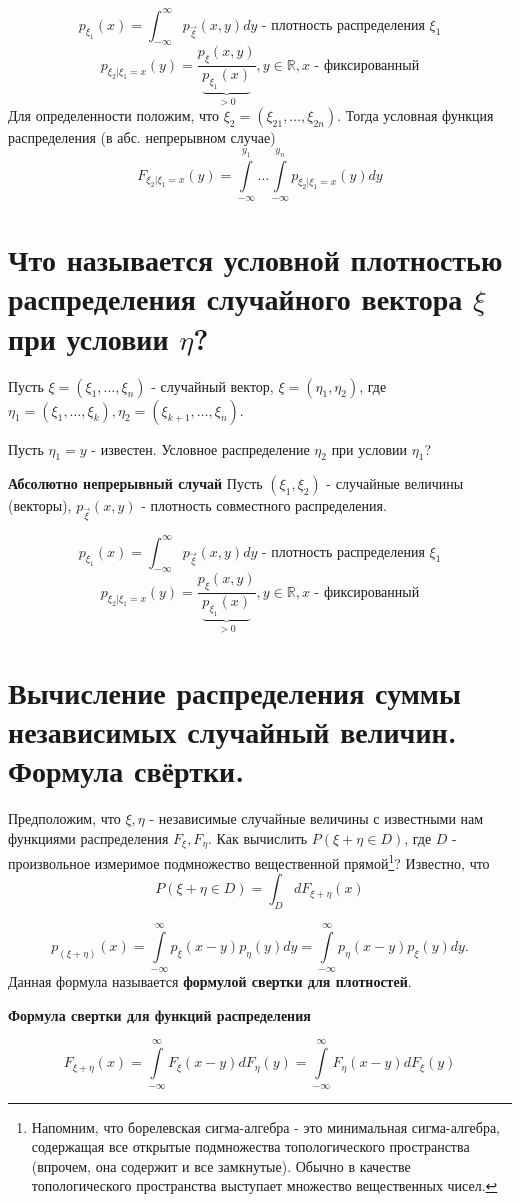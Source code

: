 \[p_{\xi_1}(x)=\int_{-\infty}^{\infty} p_{\vec{\xi}}(x,y)dy \text{ - плотность распределения } \xi_1\]
\[p_{\xi_2|\xi_1=x}(y)=\dfrac{p_\xi(x,y)}{\underbrace{p_{\xi_1}(x)}_{>0}}, y\in \mathbb{R}, x \text{ - фиксированный}\]
Для определенности положим, что $\xi_2=(\xi_{21}, \dots, \xi_{2n})$. Тогда условная функция распределения (в абс. непрерывном случае)
\[F_{\xi_2|\xi_1=x}(y)=\int\limits_{-\infty}^{y_1} \dots \int\limits_{-\infty}^{y_n} p_{\xi_2|\xi_1=x}(y)dy\]

\section{Что называется условной плотностью распределения случайного вектора $\xi$ при условии $\eta$?}

Пусть $\xi = (\xi_1,\dots,\xi_n)$ - случайный вектор, $\xi = (\eta_1, \eta_2)$, где $\eta_1=(\xi_1,\dots,\xi_k), \eta_2=(\xi_{k+1},\dots,\xi_n)$.

Пусть $\eta_1=y$ - известен. Условное распределение $\eta_2$ при условии $\eta_1$?

\noindent \textbf{Абсолютно непрерывный случай}
Пусть $(\xi_1, \xi_2)$ - случайные величины (векторы), $p_{\vec{\xi}}(x,y)$ - плотность совместного распределения.

\[p_{\xi_1}(x)=\int_{-\infty}^{\infty} p_{\vec{\xi}}(x,y)dy \text{ - плотность распределения } \xi_1\]
\[p_{\xi_2|\xi_1=x}(y)=\dfrac{p_\xi(x,y)}{\underbrace{p_{\xi_1}(x)}_{>0}}, y\in \mathbb{R}, x \text{ - фиксированный}\]

\section{Вычисление распределения суммы независимых случайный величин. Формула свёртки.}

Предположим, что $\xi, \eta$ - независимые случайные величины с известными нам функциями распределения $F_{\xi}, F_{\eta}$. Как вычислить $P(\xi + \eta \in D)$, где $D$ - произвольное измеримое подмножество вещественной прямой\footnote{Напомним, что борелевская сигма-алгебра - это минимальная сигма-алгебра, содержащая все открытые подмножества топологического пространства (впрочем, она содержит и все замкнутые). Обычно в качестве топологического пространства выступает множество вещественных чисел.}? Известно, что
\[ P(\xi + \eta \in D) = \int_{D} d F_{\xi + \eta} (x) \]


\[ p_{(\xi + \eta)} (x) = \int\limits_{-\infty}^{\infty} p_{\xi} (x - y) p_{\eta} (y) dy = \int\limits_{-\infty}^{\infty} p_{\eta} (x - y) p_{\xi} (y) dy. \]
		Данная формула называется \textbf{формулой свертки для плотностей}.
\begin{center}
	\textbf{Формула свертки для функций распределения}
\end{center}
\[ F_{\xi + \eta} (x) = \int\limits_{-\infty}^{\infty} F_{\xi} (x - y) d F_{\eta} (y) = \int\limits_{-\infty}^{\infty} F_{\eta} (x - y) d F_{\xi} (y) \]

